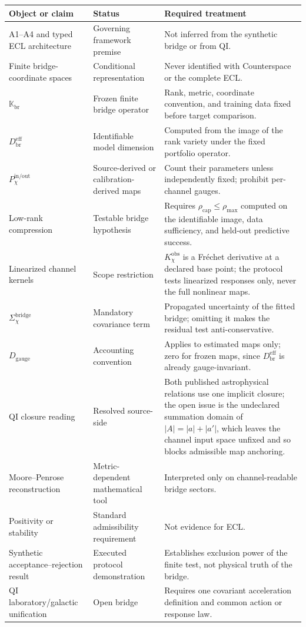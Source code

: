 \documentclass[11pt]{article}
\begin{document}
\begin{longtable}{>{\raggedright\arraybackslash}p{}>{\raggedright\arraybackslash}p{}>{\raggedright\arraybackslash}p{}}
\toprule
Object or claim & Status & Required treatment \\
\midrule
A1--A4 and typed ECL architecture & Governing framework premise & Not inferred from the synthetic bridge or from QI. \\
Finite bridge-coordinate spaces & Conditional representation & Never identified with Counterspace or the complete ECL. \\
\(\mathbb K_{\mathrm{br}}\) & Frozen finite bridge operator & Rank, metric, coordinate convention, and training data fixed before target comparison. \\
\(D_{\mathrm{br}}^{\mathrm{eff}}\) & Identifiable model dimension & Computed from the image of the rank variety under the fixed portfolio operator. \\
\(P_{\chi}^{\mathrm{in/out}}\) & Source-derived or calibration-derived maps & Count their parameters unless independently fixed; prohibit per-channel gauges. \\
Low-rank compression & Testable bridge hypothesis & Requires \(\rho_{\mathrm{cap}}\le\rho_{\max}\) computed on the identifiable image, data sufficiency, and held-out predictive success. \\
Linearized channel kernels & Scope restriction & \(K_{\chi}^{\mathrm{obs}}\) is a Fr\'echet derivative at a declared base point; the protocol tests linearized responses only, never the full nonlinear maps. \\
\(\Sigma_{\chi}^{\mathrm{bridge}}\) & Mandatory covariance term & Propagated uncertainty of the fitted bridge; omitting it makes the residual test anti-conservative. \\
\(D_{\mathrm{gauge}}\) & Accounting convention & Applies to estimated maps only; zero for frozen maps, since \(D_{\mathrm{br}}^{\mathrm{eff}}\) is already gauge-invariant. \\
QI closure reading & Resolved source-side & Both published astrophysical relations use one implicit closure; the open issue is the undeclared summation domain of \(|A|=|a|+|a'|\), which leaves the channel input space unfixed and so blocks admissible map anchoring. \\
Moore--Penrose reconstruction & Metric-dependent mathematical tool & Interpreted only on channel-readable bridge sectors. \\
Positivity or stability & Standard admissibility requirement & Not evidence for ECL. \\
Synthetic acceptance--rejection result & Executed protocol demonstration & Establishes exclusion power of the finite test, not physical truth of the bridge. \\
QI laboratory/galactic unification & Open bridge & Requires one covariant acceleration definition and common action or response law. \\
\bottomrule
\end{longtable}
\end{document}
